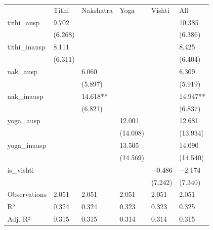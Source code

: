 \begin{tabular}{llllll}
& Tithi & Nakshatra & Yoga & Vishti & All \\
tithi\_ausp & \num{9.702} &  &  &  & \num{10.385} \\
& (\num{6.268}) &  &  &  & (\num{6.386}) \\
tithi\_inausp & \num{8.111} &  &  &  & \num{8.425} \\
& (\num{6.311}) &  &  &  & (\num{6.404}) \\
nak\_ausp &  & \num{6.060} &  &  & \num{6.309} \\
&  & (\num{5.897}) &  &  & (\num{5.919}) \\
nak\_inausp &  & \num{14.618}** &  &  & \num{14.947}** \\
&  & (\num{6.821}) &  &  & (\num{6.837}) \\
yoga\_ausp &  &  & \num{12.001} &  & \num{12.681} \\
&  &  & (\num{14.008}) &  & (\num{13.934}) \\
yoga\_inausp &  &  & \num{13.505} &  & \num{14.090} \\
&  &  & (\num{14.569}) &  & (\num{14.540}) \\
is\_vishti &  &  &  & \num{-0.486} & \num{-2.174} \\
&  &  &  & (\num{7.242}) & (\num{7.340}) \\
Observations & \num{2,051} & \num{2,051} & \num{2,051} & \num{2,051} & \num{2,051} \\
R² & \num{0.324} & \num{0.324} & \num{0.323} & \num{0.323} & \num{0.325} \\
Adj. R² & \num{0.315} & \num{0.315} & \num{0.314} & \num{0.314} & \num{0.315} \\
\end{tabular}
